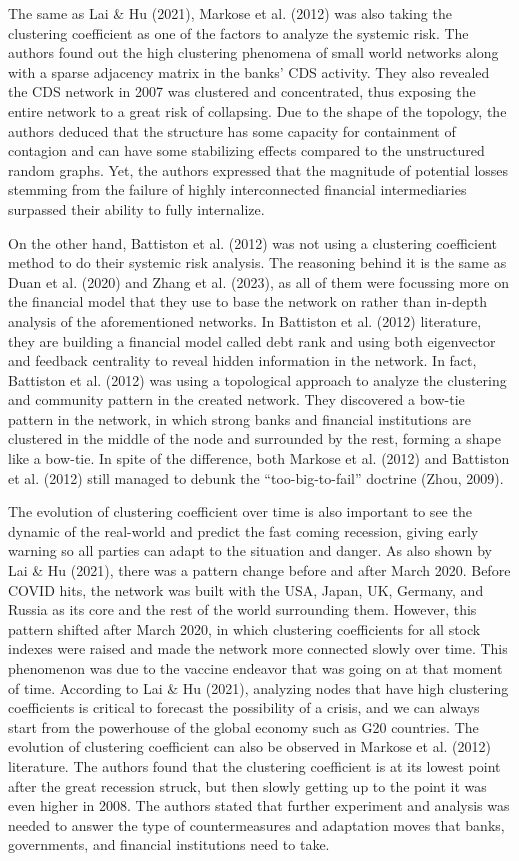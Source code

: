 \documentclass[a4paper,11pt]{article}
\begin{document}
The same as Lai \& Hu (2021), Markose et al. (2012) was also taking the clustering coefficient as one of the factors to analyze the systemic risk. The authors found out the high clustering phenomena of small world networks along with a sparse adjacency matrix in the banks’ CDS activity. They also revealed the CDS network in 2007 was clustered and concentrated, thus exposing the entire network to a great risk of collapsing. Due to the shape of the topology, the authors deduced that the structure has some capacity for containment of contagion and can have some stabilizing effects compared to the unstructured random graphs. Yet, the authors expressed that the magnitude of potential losses stemming from the failure of highly interconnected financial intermediaries surpassed their ability to fully internalize.

On the other hand, Battiston et al. (2012) was not using a clustering coefficient method to do their systemic risk analysis. The reasoning behind it is the same as Duan et al. (2020) and Zhang et al. (2023), as all of them were focussing more on the financial model that they use to base the network on rather than in-depth analysis of the aforementioned networks. In Battiston et al. (2012) literature, they are building a financial model called debt rank and using both eigenvector and feedback centrality to reveal hidden information in the network. In fact, Battiston et al. (2012) was using a topological approach to analyze the clustering and community pattern in the created network. They discovered a bow-tie pattern in the network, in which strong banks and financial institutions are clustered in the middle of the node and surrounded by the rest, forming a shape like a bow-tie. In spite of the difference, both Markose et al. (2012) and Battiston et al. (2012) still managed to debunk the “too-big-to-fail” doctrine (Zhou, 2009).

The evolution of clustering coefficient over time is also important to see the dynamic of the real-world and predict the fast coming recession, giving early warning so all parties can adapt to the situation and danger. As also shown by Lai \& Hu (2021), there was a pattern change before and after March 2020. Before COVID hits, the network was built with the USA, Japan, UK, Germany, and Russia as its core and the rest of the world surrounding them. However, this pattern shifted after March 2020, in which clustering coefficients for all stock indexes were raised and made the network more connected slowly over time. This phenomenon was due to the vaccine endeavor that was going on at that moment of time. According to Lai \& Hu (2021), analyzing nodes that have high clustering coefficients is critical to forecast the possibility of a crisis, and we can always start from the powerhouse of the global economy such as G20 countries. The evolution of clustering coefficient can also be observed in Markose et al. (2012) literature. The authors found that the clustering coefficient is at its lowest point after the great recession struck, but then slowly getting up to the point it was even higher in 2008. The authors stated that further experiment and analysis was needed to answer the type of countermeasures and adaptation moves that banks, governments, and financial institutions need to take.
\end{document}
